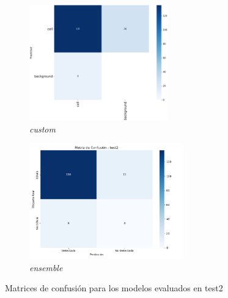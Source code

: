 \documentclass[12pt,a4paper,onecolumn,oneside]{report}
\begin{document}
\begin{figure}[H]
  \vspace{0.1cm}
  \begin{subfigure}[b]{0.45\textwidth}
    \centering
    \includegraphics[height=5cm]{figuras/resultados experimentacion/custom/test2/confusion_matrix.png}
    \vspace{-0.3cm}
    \caption{\footnotesize \textit{custom}}
    \label{fig:confusion_custom_test2}
  \end{subfigure}
  \hfill
  \begin{subfigure}[b]{0.45\textwidth}
    \centering
    \includegraphics[height=5cm]{figuras/resultados experimentacion/ensemble/confusion_matrices/confusion_matrix_test2.png}
    \vspace{-0.3cm}
    \caption{\footnotesize \textit{ensemble}}
    \label{fig:confusion_ensemble_test2}
  \end{subfigure}
  
  \vspace{-0.2cm}
  \caption{Matrices de confusión para los modelos evaluados en test2}
  \label{fig:confusion_matrices_test2}
\end{figure}
\end{document}
